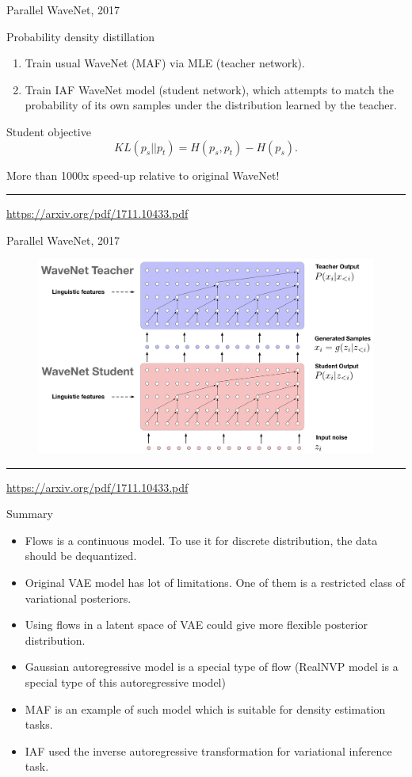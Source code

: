 \begin{frame}{Parallel WaveNet, 2017}
	\begin{block}{Probability density distillation}
		\begin{enumerate}
			\item Train usual WaveNet (MAF) via MLE (teacher network).
			\item Train IAF WaveNet model (student network), which attempts to match the probability of its own samples under the distribution learned by the teacher.
		\end{enumerate}
	\end{block}
	\begin{block}{Student objective}
		\[
		KL(p_s || p_t) = H(p_s, p_t) - H(p_s).
		\]
	\end{block}
	More than 1000x speed-up relative to original WaveNet!
	\vfill
	\hrule\medskip
	{\scriptsize \href{https://arxiv.org/pdf/1711.10433.pdf}{https://arxiv.org/pdf/1711.10433.pdf}}
\end{frame}
\begin{frame}{Parallel WaveNet, 2017}
	\begin{figure}
		\centering
		\includegraphics[width=\linewidth]{figs/parallel_wavenet.png}
	\end{figure}
	\vfill
	\hrule\medskip
	{\scriptsize \href{https://arxiv.org/pdf/1711.10433.pdf}{https://arxiv.org/pdf/1711.10433.pdf}}
\end{frame}
\begin{frame}{Summary}
	\begin{itemize}
		\item Flows is a continuous model. To use it for discrete distribution, the data should be dequantized.
		\item Original VAE model has lot of limitations. One of them is a restricted class of variational posteriors.
		\item Using flows in a latent space of VAE could give more flexible posterior distribution.
		\item Gaussian autoregressive model is a special type of flow (RealNVP model is a special type of this autoregressive model)
		\item MAF is an example of such model which is suitable for density estimation tasks.
		\item  IAF used the inverse autoregressive transformation for variational inference task.
	\end{itemize}
\end{frame}

